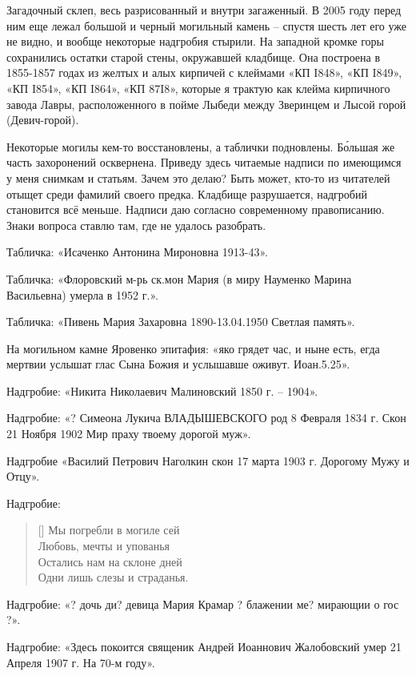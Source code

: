 Загадочный склеп, весь разрисованный и внутри загаженный. В 2005 году перед ним еще лежал большой и черный могильный камень – спустя шесть лет его уже не видно, и вообще некоторые надгробия стырили. На западной кромке горы сохранились остатки старой стены, окружавшей кладбище. Она построена в 1855-1857 годах из желтых и алых кирпичей с клеймами «КП I848», «КП I849», «КП I854», «КП I864», «КП 87I8», которые я трактую как клейма кирпичного завода Лавры, расположенного в пойме Лыбеди между Зверинцем и Лысой горой (Девич-горой).  

Некоторые могилы кем-то восстановлены, а таблички подновлены. Б\'ольшая же часть захоронений осквернена. Приведу здесь читаемые надписи по имеющимся у меня снимкам и статьям. Зачем это делаю? Быть может, кто-то из читателей отыщет среди фамилий своего предка. Кладбище разрушается, надгробий становится всё меньше. Надписи даю согласно современному правописанию. Знаки вопроса ставлю там, где не удалось разобрать.

Табличка: «Исаченко Антонина Мироновна 1913-43».

Табличка: «Флоровский м-рь ск.мон Мария (в миру Науменко Марина Васильевна) умерла в 1952 г.».

Табличка: «Пивень Мария Захаровна 1890-13.04.1950 Светлая память».

На могильном камне Яровенко эпитафия: «яко грядет час, и ныне есть, егда мертвии услышат глас Сына Божия и услышавше оживут. Иоан.5.25».

Надгробие: «Никита Николаевич Малиновский 1850 г. – 1904».

Надгробие: «? Симеона Лукича ВЛАДЫШЕВСКОГО род 8 Февраля 1834 г. Скон 21 Ноября 1902 Мир праху твоему дорогой муж».

Надгробие «Василий Петрович Наголкин скон 17 марта 1903 г. Дорогому Мужу и Отцу».

Надгробие:

\settowidth{\versewidth}{Остались нам на склоне дней.} 
\begin{verse}[\versewidth]
Мы погребли в могиле сей\\
Любовь, мечты и упованья\\
Остались нам на склоне дней\\
Одни лишь слезы и страданья.\\
\end{verse}

Надгробие: «? дочь ди? девица Мария Крамар ? блажении ме? мирающии о гос ?».

Надгробие: «Здесь покоится священик Андрей Иоаннович Жалобовский умер 21 Апреля 1907 г. На 70-м году».

